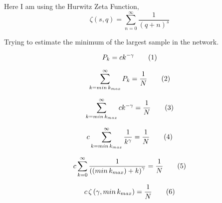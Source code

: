 Here I am using the Hurwitz Zeta Function,
\[
  \zeta
  \left(
    s, q
  \right)
  =
  \sum_{n = 0}^{\infty}
  \frac{1}{(q + n)^s}
\]

Trying to estimate the minimum of the largest sample in the network.

\[
  P_k =
  c k^{-\gamma}
  \addtag
\]

\[
  \sum_{k = min \, k_{max}}^{\infty}
  P_k
  =
  \frac{1}{N}
  \addtag
\]

\[
  \sum_{k = min \, k_{max}}^{\infty}
  c k^{-\gamma}
  =
  \frac{1}{N}
  \addtag
\]

\[
  c
  \sum_{k = min \, k_{max}}^{\infty}
  \frac{1}{k^{\gamma}}
  =
  \frac{1}{N}
  \addtag
\]

\[
  c
  \sum_{k = 0}^{\infty}
  \frac{1}{
    \left(
      (min \, k_{max}) + k
    \right)^{\gamma}
  }
  =
  \frac{1}{N}
  \addtag
\]

\[
  c \,
  \zeta
  \left(
    \gamma, min \, k_{max}
  \right)
  =
  \frac{1}{N}
  \addtag
\]